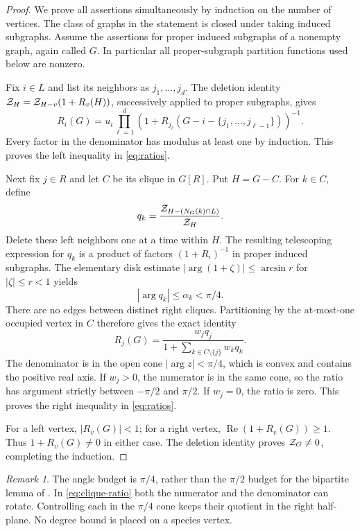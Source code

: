 \documentclass[11pt]{article}
\numberwithin{equation}{section}
\theoremstyle{remark}\newtheorem{remark}[theorem]{Remark}
\begin{document}
\begin{proof}
We prove all assertions simultaneously by induction on the number of
vertices. The class of graphs in the statement is closed under taking
induced subgraphs. Assume the assertions for proper induced subgraphs
of a nonempty graph, again called $G$. In particular all proper-subgraph
partition functions used below are nonzero.

Fix $i\in L$ and list its neighbors as $j_1,\ldots,j_d$. The deletion
identity $\mathcal Z_H=\mathcal Z_{H-v}(1+R_v(H))$, successively applied to proper
subgraphs, gives
\[
 R_i(G)=u_i\prod_{\ell=1}^d(1+R_{j_\ell}(G-i-\{j_1,\ldots,j_{\ell-1}\}))^{-1}.
\]
Every factor in the denominator has modulus at least one by induction.
This proves the left inequality in \eqref{eq:ratios}.

Next fix $j\in R$ and let $C$ be its clique in $G[R]$. Put $H=G-C$.
For $k\in C$, define
\[
 q_k=\frac{\mathcal Z_{H-(N_G(k)\cap L)}}{\mathcal Z_H}.
\]
Delete these left neighbors one at a time within $H$. The resulting
telescoping expression for $q_k$ is a product of factors $(1+R_i)^{-1}$
in proper induced subgraphs. The elementary disk estimate
$|\arg(1+\zeta)|\le\arcsin r$ for $|\zeta|\le r<1$ yields
\[
 |\arg q_k|\le\alpha_k<\pi/4.
\]
There are no edges between distinct right cliques. Partitioning by the
at-most-one occupied vertex in $C$ therefore gives the exact identity
\begin{equation}\label{eq:clique-ratio}
 R_j(G)=\frac{w_jq_j}{1+\sum_{k\in C\setminus\{j\}}w_kq_k}.
\end{equation}
The denominator is in the open cone $|\arg z|<\pi/4$, which is convex
and contains the positive real axis. If $w_j>0$, the numerator is in the
same cone, so the ratio has argument strictly between $-\pi/2$ and
$\pi/2$. If $w_j=0$, the ratio is zero. This proves the right inequality
in \eqref{eq:ratios}.

For a left vertex, $|R_v(G)|<1$; for a right vertex,
$\operatorname{Re}(1+R_v(G))\ge1$. Thus $1+R_v(G)\ne0$ in either case.
The deletion identity proves $\mathcal Z_G\ne0$, completing the induction.
\end{proof}

\begin{remark}
The angle budget is $\pi/4$, rather than the $\pi/2$ budget for the
bipartite lemma of \cite{LongOptimal}. In \eqref{eq:clique-ratio} both
the numerator and the denominator can rotate. Controlling each in the
$\pi/4$ cone keeps their quotient in the right half-plane. No degree
bound is placed on a species vertex.
\end{remark}
\end{document}

